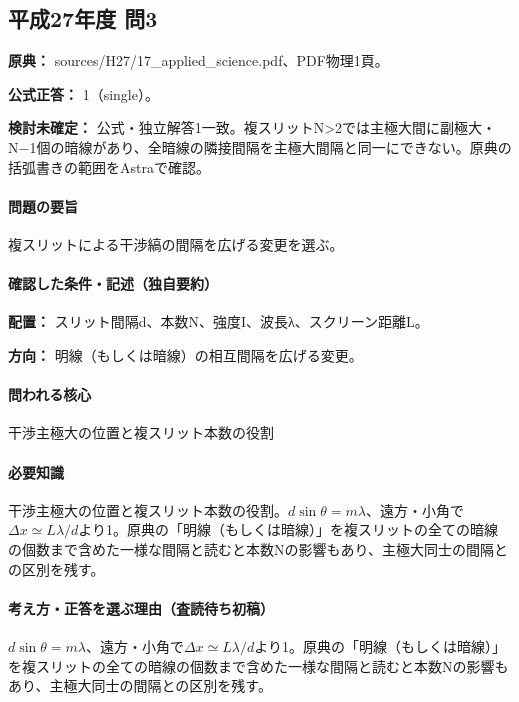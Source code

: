 \subsection{平成27年度 問3}
\label{q:h27-reg-applied-03}

\noindent\textbf{原典：} sources/H27/17\_applied\_science.pdf、PDF物理1頁。

\textbf{公式正答：} 1（single）。

\par\textbf{検討未確定：} 公式・独立解答1一致。複スリットN>2では主極大間に副極大・N−1個の暗線があり、全暗線の隣接間隔を主極大間隔と同一にできない。原典の括弧書きの範囲をAstraで確認。

\paragraph{問題の要旨} 複スリットによる干渉縞の間隔を広げる変更を選ぶ。

\paragraph{確認した条件・記述（独自要約）}\mbox{}\par

\noindent\textbf{配置：} スリット間隔d、本数N、強度I、波長λ、スクリーン距離L。\par

\noindent\textbf{方向：} 明線（もしくは暗線）の相互間隔を広げる変更。\par

\paragraph{問われる核心} 干渉主極大の位置と複スリット本数の役割

\paragraph{必要知識} 干渉主極大の位置と複スリット本数の役割。\(d\sin\theta=m\lambda\)、遠方・小角で\(\Delta x\simeq L\lambda/d\)より1。原典の「明線（もしくは暗線）」を複スリットの全ての暗線の個数まで含めた一様な間隔と読むと本数Nの影響もあり、主極大同士の間隔との区別を残す。

\paragraph{考え方・正答を選ぶ理由（査読待ち初稿）} \(d\sin\theta=m\lambda\)、遠方・小角で\(\Delta x\simeq L\lambda/d\)より1。原典の「明線（もしくは暗線）」を複スリットの全ての暗線の個数まで含めた一様な間隔と読むと本数Nの影響もあり、主極大同士の間隔との区別を残す。


